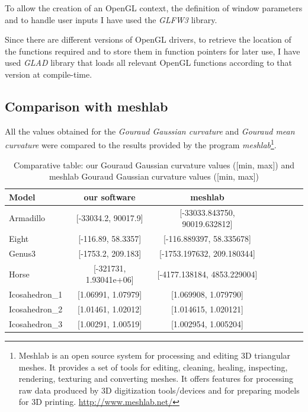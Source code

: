 To allow the creation of an OpenGL context, the definition of window parameters and to handle user inputs I have used the \textit{GLFW3} library.

Since there are different versions of OpenGL drivers, to retrieve the location of the functions required and to store them in function pointers for later use, I have used \textit{GLAD} library that loads all relevant OpenGL functions according to that version at compile-time.

\subsection{Comparison with meshlab}
All the values obtained for the \textit{Gouraud Gaussian curvature} and \textit{Gouraud mean curvature} were compared to the results provided by the program \textit{meshlab}\footnote{Meshlab is an open source system for processing and editing 3D triangular meshes.
It provides a set of tools for editing, cleaning, healing, inspecting, rendering, texturing and converting meshes. It offers features for processing raw data produced by 3D digitization tools/devices and for preparing models for 3D printing. \url{http://www.meshlab.net/}}.


\begin{table}[!h]%
    \centering
\begin{tabular}{l*{6}{c}r}
    \centering
    Model              & our software &  meshlab \\
    \hline
    Armadillo          & [-33034.2, 90017.9] & [-33033.843750, 90019.632812] \\
    Eight              & [-116.89, 58.3357] & [-116.889397, 58.335678] \\
    Genus3             & [-1753.2, 209.183] & [-1753.197632, 209.180344]  \\
    Horse              & [-321731, 1.93041e+06] &  [-4177.138184, 4853.229004]\\
    Icosahedron\_1      &  [1.06991, 1.07979] & [1.069908, 1.079790] \\
    Icosahedron\_2      &  [1.01461, 1.02012] & [1.014615, 1.020121] \\
    Icosahedron\_3      & [1.00291, 1.00519] &  [1.002954, 1.005204]
\end{tabular}
\caption{Comparative table: our Gouraud Gaussian curvature values ([min, max]) and meshlab Gouraud Gaussian curvature values ([min, max])}
\label{table:table-gaussian-meshlab}
\end{table}



